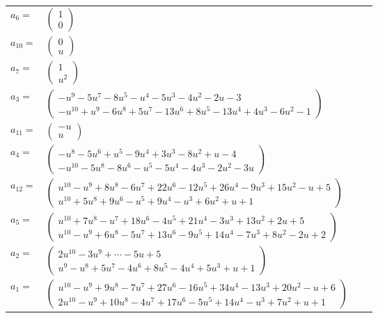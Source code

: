 \documentclass[1p]{elsarticle_modified}
\theoremstyle{definition}
\begin{document}
\begin{tabular}{m{7pt} m{180pt} m{7pt} m{180pt} }
\flushright $a_{6}=$&$\begin{pmatrix}1\\0\end{pmatrix}$ \\
\flushright $a_{10}=$&$\begin{pmatrix}0\\u\end{pmatrix}$ \\
\flushright $a_{7}=$&$\begin{pmatrix}1\\u^2\end{pmatrix}$ \\
\flushright $a_{3}=$&$\begin{pmatrix}- u^9-5 u^7-8 u^5- u^4-5 u^3-4 u^2-2 u-3\\- u^{10}+u^9-6 u^8+5 u^7-13 u^6+8 u^5-13 u^4+4 u^3-6 u^2-1\end{pmatrix}$ \\
\flushright $a_{11}=$&$\begin{pmatrix}- u\\u\end{pmatrix}$ \\
\flushright $a_{4}=$&$\begin{pmatrix}- u^8-5 u^6+u^5-9 u^4+3 u^3-8 u^2+u-4\\- u^{10}-5 u^8-8 u^6- u^5-5 u^4-4 u^3-2 u^2-3 u\end{pmatrix}$ \\
\flushright $a_{12}=$&$\begin{pmatrix}u^{10}- u^9+8 u^8-6 u^7+22 u^6-12 u^5+26 u^4-9 u^3+15 u^2- u+5\\u^{10}+5 u^8+9 u^6- u^5+9 u^4- u^3+6 u^2+u+1\end{pmatrix}$ \\
\flushright $a_{5}=$&$\begin{pmatrix}u^{10}+7 u^8- u^7+18 u^6-4 u^5+21 u^4-3 u^3+13 u^2+2 u+5\\u^{10}- u^9+6 u^8-5 u^7+13 u^6-9 u^5+14 u^4-7 u^3+8 u^2-2 u+2\end{pmatrix}$ \\
\flushright $a_{2}=$&$\begin{pmatrix}2 u^{10}-3 u^9+\cdots-5 u+5\\u^9- u^8+5 u^7-4 u^6+8 u^5-4 u^4+5 u^3+u+1\end{pmatrix}$ \\
\flushright $a_{1}=$&$\begin{pmatrix}u^{10}- u^9+9 u^8-7 u^7+27 u^6-16 u^5+34 u^4-13 u^3+20 u^2- u+6\\2 u^{10}- u^9+10 u^8-4 u^7+17 u^6-5 u^5+14 u^4- u^3+7 u^2+u+1\end{pmatrix}$ \\

\end{tabular}
\end{document}
